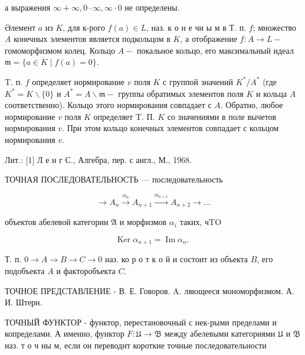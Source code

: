 \documentclass[10pt]{article}
\begin{document}
а выражения $\infty+\infty, 0 \cdot \infty, \infty \cdot 0$ не определены.



Әлемент $a$ из $K$, для к-рого $f(a) \in L$, наз. к о н е чн ы м в Т. п. $f$; множество $A$ конечных элементов является подкольцом в $K$, а отображение $f: A \rightarrow L-$ гомоморфизмом колец. Кольцо $A-$ покальное кольцо, его максимальный идеал $\mathfrak{m}=\{a \in K \mid f(a)=0\}$.



T. п. $f$ определяет нормирование $v$ поля $K$ с группой значений $K^{*} / A^{*}$ (где $K^{*}=K \backslash\{0\}$ и $A^{*}=A \backslash \mathfrak{m}-$ группы обратимых элементов поля $K$ и кольца $A$ соответственно). Кольцо этого нормирования совпадает с $A$. Обратно, любое нормирование $v$ поля $K$ определяет T. П. $K$ со значениями в поле вычетов нормирования $v$. При этом кольцо конечных элементов совпадает с кольцом нормирования $v$.



Лит.: [1] Л е н г С., Алгебра, пер. с англ., М., 1968.



ТОЧНАЯ ПОСЛЕДОВАТЕЛЬНОСТЬ — последовательность



\[

\rightarrow A_{n} \stackrel{\alpha_{n}}{\longrightarrow} A_{n+1} \stackrel{\alpha_{n+1}}{\longrightarrow} A_{n+2} \longrightarrow \ldots

\]



объектов абелевой категории $\mathfrak{A}$ и морфизмов $\alpha_{i}$ таких, чTO



\[

\operatorname{Ker} \alpha_{n+1}=\operatorname{Im} \alpha_{n} \text {. }

\]



Т. п. $0 \rightarrow A \rightarrow B \rightarrow C \rightarrow 0$ наз. ко р о т к о й и состоит из объекта $B$, его подобъекта $A$ и факторобъекта $C$.



ТОЧНОЕ ПРЕДСТАВЛЕНИЕ - В. Е. Говоров. A. ляющееся мономорфизмом. А. И. Штерн.



ТОЧНЫЙ ФУНКТОР - функтор, перестановочный с нек-рыми пределами и копределами. А именно, функтор $F: \mathfrak{U} \rightarrow \mathfrak{B}$ между абелевыми категориями $\mathfrak{U}$ и $\mathfrak{B}$ наз. т о ч ны м, если он переводит короткие точные последовательности
\end{document}
